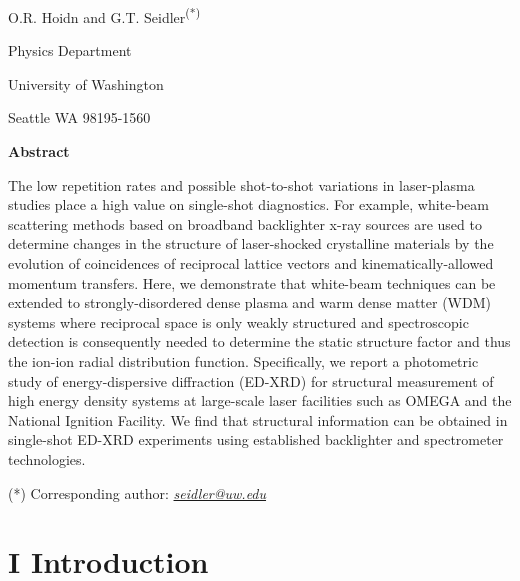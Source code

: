 
\begin{center}
O.R. Hoidn and G.T. Seidler\textsuperscript{(*)}

Physics Department

University of Washington

Seattle WA 98195-1560
\end{center}

\textbf{Abstract}

The low repetition rates and possible shot-to-shot variations in
laser-plasma studies place a high value on single-shot diagnostics. For
example, white-beam scattering methods based on broadband backlighter
x-ray sources are used to determine changes in the structure of
laser-shocked crystalline materials by the evolution of coincidences of
reciprocal lattice vectors and kinematically-allowed momentum transfers.
Here, we demonstrate that white-beam techniques can be extended to
strongly-disordered dense plasma and warm dense matter (WDM) systems
where reciprocal space is only weakly structured and spectroscopic
detection is consequently needed to determine the static structure
factor and thus the ion-ion radial distribution function. Specifically,
we report a photometric study of energy-dispersive diffraction (ED-XRD)
for structural measurement of high energy density systems at large-scale
laser facilities such as OMEGA and the National Ignition Facility. We
find that structural information can be obtained in single-shot ED-XRD
experiments using established backlighter and spectrometer technologies.

(*) Corresponding author:
\href{mailto:seidler@uw.edu}{\emph{seidler@uw.edu}}


\section{I Introduction}\label{i-introduction}

